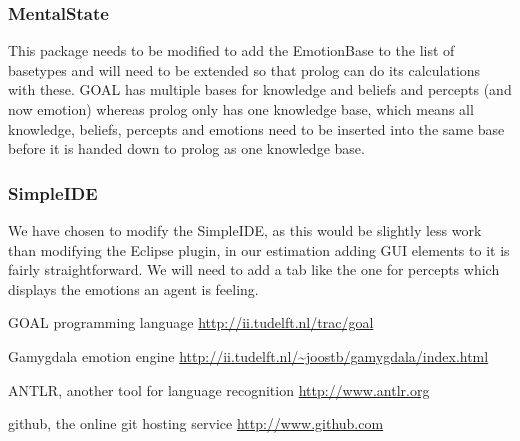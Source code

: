 \documentclass[]{article}
\begin{document}
\subsubsection{MentalState}
This package needs to be modified to add the EmotionBase to the list of basetypes and will need to be extended so that prolog can do its calculations with these. GOAL has multiple bases for knowledge and beliefs and percepts (and now emotion) whereas prolog only has one knowledge base, which means all knowledge, beliefs, percepts and emotions need to be inserted into the same base before it is handed down to prolog as one knowledge base. \\

\subsubsection{SimpleIDE}
We have chosen to modify the SimpleIDE, as this would be slightly less work than modifying the Eclipse plugin, in our estimation adding GUI elements to it is fairly straightforward. We will need to add a tab like the one for percepts which displays the emotions an agent is feeling.

\clearpage
\printglossaries
\begin{thebibliography}{9}
	
	GOAL programming language
	\url{http://ii.tudelft.nl/trac/goal}
	
	Gamygdala emotion engine
	\url{http://ii.tudelft.nl/~joostb/gamygdala/index.html}
	
	ANTLR, another tool for language recognition
	\url{http://www.antlr.org}

	github, the online git hosting service
	\url{http://www.github.com}
	
	
\end{thebibliography}
\end{document}
